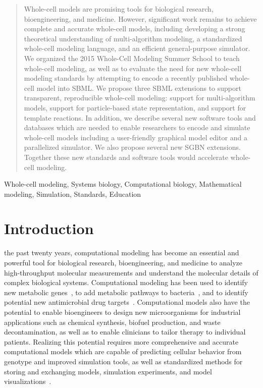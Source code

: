 \documentclass[journal,transmag]{IEEEtran}
\begin{document}
\begin{abstract}
Whole-cell models are promising tools for biological research, bioengineering, and medicine. 
However, significant work remains to achieve complete and accurate whole-cell models, including developing a strong theoretical understanding of multi-algorithm modeling, a standardized whole-cell modeling language, and an efficient general-purpose simulator.
We organized the 2015 Whole-Cell Modeling Summer School to teach whole-cell modeling, as well as to evaluate the need for new whole-cell modeling standards by attempting to encode a recently published whole-cell model into SBML.
We propose three SBML extensions to support transparent, reproducible whole-cell modeling: support for multi-algorithm models, support for particle-based state representation, and support for template reactions. In addition, we describe several new software tools and databases which are needed to enable researchers to encode and simulate whole-cell models including a user-friendly graphical model editor and a parallelized simulator. We also propose several new SGBN extensions.
Together these new standards and software tools would accelerate whole-cell modeling.
\end{abstract}

\begin{IEEEkeywords}
Whole-cell modeling, Systems biology, Computational biology, Mathematical modeling, Simulation, Standards, Education
\end{IEEEkeywords}

\IEEEpeerreviewmaketitle

\section{Introduction}

 the past twenty years, computational modeling has become an essential and powerful tool for biological research, bioengineering, and medicine to analyze high-throughput molecular measurements and understand the molecular details of complex biological systems. Computational modeling has  been used to identify new metabolic genes~\cite{Reed2006}, to add metabolic pathways to bacteria~\cite{Lee2012}, and to identify potential new antimicrobial drug targets~\cite{Lee2009}.
Computational models also have the potential to enable bioengineers to design new microorganisms for industrial applications such as chemical synthesis, biofuel production, and waste decontamination, as well as to enable clinicians to tailor therapy to individual patients. Realizing this potential requires more comprehensive and accurate computational models which are capable of predicting cellular behavior from genotype and improved simulation tools, as well as standardized methods for storing and exchanging models, simulation experiments, and model visualizations~\cite{Macklin2014,Karr2015,Karr2015b,hucka2015promoting,Klipp07,path2models2013}.
\end{document}
